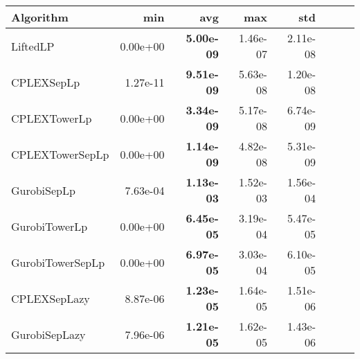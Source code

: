 \begin{tabular}{lrrrrrrr}
Algorithm & min & avg & max & std
\\
\hline
LiftedLP&0.00e+00& \bf5.00e-09& 1.46e-07& 2.11e-08\\
CPLEXSepLp&1.27e-11& \bf9.51e-09& 5.63e-08& 1.20e-08\\
CPLEXTowerLp&0.00e+00& \bf3.34e-09& 5.17e-08& 6.74e-09\\
CPLEXTowerSepLp&0.00e+00& \bf1.14e-09& 4.82e-08& 5.31e-09\\
GurobiSepLp&7.63e-04& \bf1.13e-03& 1.52e-03& 1.56e-04\\
GurobiTowerLp&0.00e+00& \bf6.45e-05& 3.19e-04& 5.47e-05\\
GurobiTowerSepLp&0.00e+00& \bf6.97e-05& 3.03e-04& 6.10e-05\\
CPLEXSepLazy&8.87e-06& \bf1.23e-05& 1.64e-05& 1.51e-06\\
GurobiSepLazy&7.96e-06& \bf1.21e-05& 1.62e-05& 1.43e-06
\end{tabular}
